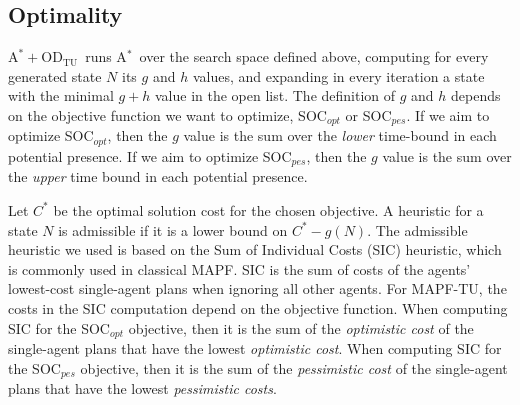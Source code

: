\documentclass[jair,twoside,11pt,theapa]{article}
\newcommand{\astar}{A$^*$\xspace}
\newcommand{\odatu}{$\mathrm{A^{*}+OD_{TU}}$\xspace}
\newcommand{\mapftu}{MAPF-TU\xspace}
\newcommand{\socopt}{SOC$_{opt}$\xspace}
\newcommand{\socpes}{SOC$_{pes}$\xspace}
\begin{document}
\subsection{Optimality}

\odatu\ runs \astar\ over the search space defined above, 
computing for every generated state $N$ its $g$ and $h$ values, and expanding in every iteration a state with the minimal $g+h$ value in the open list. 
The definition of $g$ and $h$ depends on the objective function we want to optimize, \socopt or \socpes. 
If we aim to optimize \socopt, then the $g$ value is the sum over the \emph{lower} time-bound in each potential presence. If we aim to optimize \socpes, then the $g$ value is the sum over the \emph{upper} time bound in each potential presence. 


Let $C^*$ be the optimal solution cost for the chosen objective. 
A heuristic for a state $N$ is admissible if it is a lower bound on $C^*-g(N)$.  
The admissible heuristic we used is based on the Sum of Individual Costs (SIC) heuristic, which is commonly used in classical MAPF. SIC is the sum of costs of the agents' lowest-cost single-agent plans when ignoring all other agents. 
For \mapftu, the costs in the SIC computation depend on the objective function. 
When computing SIC for the \socopt objective, then it is the sum of the \emph{optimistic cost} of the single-agent plans that have the lowest \emph{optimistic cost}. 
When computing SIC for the \socpes objective, then it is the sum of the \emph{pessimistic cost} of the single-agent plans that have the lowest \emph{pessimistic costs}. 
%
%

\end{document}
